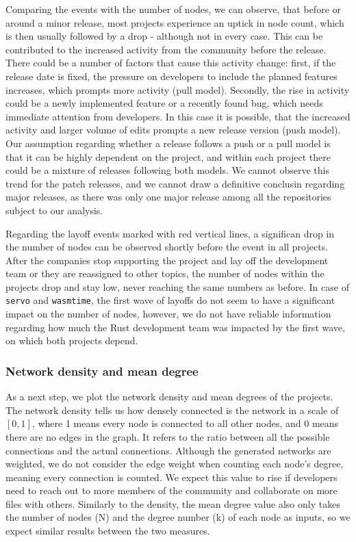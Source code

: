 Comparing the events with the number of nodes, we can observe, that before or around a minor release, most projects experience an uptick in node count, which is then usually followed by a drop - although not in every case. This can be contributed to the increased activity from the community before the release. There could be a number of factors that cause this activity change: first, if the release date is fixed, the pressure on developers to include the planned features increases, which prompts more activity (pull model). Secondly, the rise in activity could be a newly implemented feature or a recently found bug, which needs immediate attention from developers. In this case it is possible, that the increased activity and larger volume of edits prompts a new release version (push model). Our assumption regarding whether a release follows a push or a pull model is that it can be highly dependent on the project, and within each project there could be a mixture of releases following both models. We cannot observe this trend for the patch releases, and we cannot draw a definitive conclusin regarding major releases, as there was only one major release among all the repositories subject to our analysis.

Regarding the layoff events marked with red vertical lines, a significan drop in the number of nodes can be observed shortly before the event in all projects. After the companies stop supporting the project and lay off the development team or they are reassigned to other topics, the number of nodes within the projects drop and stay low, never reaching the same numbers as before. In case of \texttt{servo} and \texttt{wasmtime}, the first wave of layoffs do not seem to have a significant impact on the number of nodes, however, we do not have reliable information regarding how much the Rust development team was impacted by the first wave, on which both projects depend.

\subsubsection{Network density and mean degree}
\label{sec:density_degree}
As a next step, we plot the network density and mean degrees of the projects. The network density tells us how densely connected is the network in a scale of $[0,1]$, where 1 means every node is connected to all other nodes, and 0 means there are no edges in the graph. It refers to the ratio between all the possible connections and the actual connections. Although the generated networks are weighted, we do not consider the edge weight when counting each node's degree, meaning every connection is counted. We expect this value to rise if developers need to reach out to more members of the community and collaborate on more files with others. Similarly to the density, the mean degree value also only takes the number of nodes (N) and the degree number (k) of each node as inputs, so we expect similar results between the two measures.


